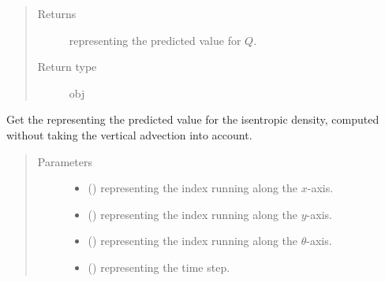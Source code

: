 \documentclass[letterpaper,10pt,english]{sphinxmanual}
\begin{document}
\begin{fulllineitems}
\begin{fulllineitems}
\begin{quote}
\begin{description}
\begin{itemize}
\end{itemize}

\item[{Returns}] \leavevmode
{} representing the predicted value for \(Q\).

\item[{Return type}] \leavevmode
obj

\end{description}\end{quote}

\end{fulllineitems}


\begin{fulllineitems}
\label{\detokenize{api:dycore.flux_isentropic_maccormack.FluxIsentropicMacCormack._get_maccormack_horizontal_predicted_value_density}}
Get the  representing the predicted value for the isentropic density,
computed without taking the vertical advection into account.
\begin{quote}\begin{description}
\item[{Parameters}] \leavevmode\begin{itemize}
\item {} 
 () \textendash{}  representing the index running along the \(x\)-axis.

\item {} 
 () \textendash{}  representing the index running along the \(y\)-axis.

\item {} 
 () \textendash{}  representing the index running along the \(\theta\)-axis.

\item {} 
 () \textendash{}  representing the time step.


\end{itemize}
\end{description}
\end{quote}
\end{fulllineitems}
\end{fulllineitems}
\end{document}
